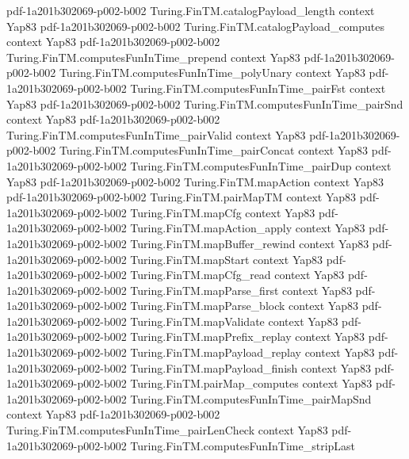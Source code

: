 \begin{theorem}
  {pdf-1a201b302069-p002-b002}
\proofstep
  {Turing.FinTM.catalogPayload_length}
  {context}
  {Yap83}
  {pdf-1a201b302069-p002-b002}
\proofstep
  {Turing.FinTM.catalogPayload_computes}
  {context}
  {Yap83}
  {pdf-1a201b302069-p002-b002}
\proofstep
  {Turing.FinTM.computesFunInTime_prepend}
  {context}
  {Yap83}
  {pdf-1a201b302069-p002-b002}
\proofstep
  {Turing.FinTM.computesFunInTime_polyUnary}
  {context}
  {Yap83}
  {pdf-1a201b302069-p002-b002}
\proofstep
  {Turing.FinTM.computesFunInTime_pairFst}
  {context}
  {Yap83}
  {pdf-1a201b302069-p002-b002}
\proofstep
  {Turing.FinTM.computesFunInTime_pairSnd}
  {context}
  {Yap83}
  {pdf-1a201b302069-p002-b002}
\proofstep
  {Turing.FinTM.computesFunInTime_pairValid}
  {context}
  {Yap83}
  {pdf-1a201b302069-p002-b002}
\proofstep
  {Turing.FinTM.computesFunInTime_pairConcat}
  {context}
  {Yap83}
  {pdf-1a201b302069-p002-b002}
\proofstep
  {Turing.FinTM.computesFunInTime_pairDup}
  {context}
  {Yap83}
  {pdf-1a201b302069-p002-b002}
\proofstep
  {Turing.FinTM.mapAction}
  {context}
  {Yap83}
  {pdf-1a201b302069-p002-b002}
\proofstep
  {Turing.FinTM.pairMapTM}
  {context}
  {Yap83}
  {pdf-1a201b302069-p002-b002}
\proofstep
  {Turing.FinTM.mapCfg}
  {context}
  {Yap83}
  {pdf-1a201b302069-p002-b002}
\proofstep
  {Turing.FinTM.mapAction_apply}
  {context}
  {Yap83}
  {pdf-1a201b302069-p002-b002}
\proofstep
  {Turing.FinTM.mapBuffer_rewind}
  {context}
  {Yap83}
  {pdf-1a201b302069-p002-b002}
\proofstep
  {Turing.FinTM.mapStart}
  {context}
  {Yap83}
  {pdf-1a201b302069-p002-b002}
\proofstep
  {Turing.FinTM.mapCfg_read}
  {context}
  {Yap83}
  {pdf-1a201b302069-p002-b002}
\proofstep
  {Turing.FinTM.mapParse_first}
  {context}
  {Yap83}
  {pdf-1a201b302069-p002-b002}
\proofstep
  {Turing.FinTM.mapParse_block}
  {context}
  {Yap83}
  {pdf-1a201b302069-p002-b002}
\proofstep
  {Turing.FinTM.mapValidate}
  {context}
  {Yap83}
  {pdf-1a201b302069-p002-b002}
\proofstep
  {Turing.FinTM.mapPrefix_replay}
  {context}
  {Yap83}
  {pdf-1a201b302069-p002-b002}
\proofstep
  {Turing.FinTM.mapPayload_replay}
  {context}
  {Yap83}
  {pdf-1a201b302069-p002-b002}
\proofstep
  {Turing.FinTM.mapPayload_finish}
  {context}
  {Yap83}
  {pdf-1a201b302069-p002-b002}
\proofstep
  {Turing.FinTM.pairMap_computes}
  {context}
  {Yap83}
  {pdf-1a201b302069-p002-b002}
\proofstep
  {Turing.FinTM.computesFunInTime_pairMapSnd}
  {context}
  {Yap83}
  {pdf-1a201b302069-p002-b002}
\proofstep
  {Turing.FinTM.computesFunInTime_pairLenCheck}
  {context}
  {Yap83}
  {pdf-1a201b302069-p002-b002}
\proofstep
  {Turing.FinTM.computesFunInTime_stripLast}

\end{theorem}
